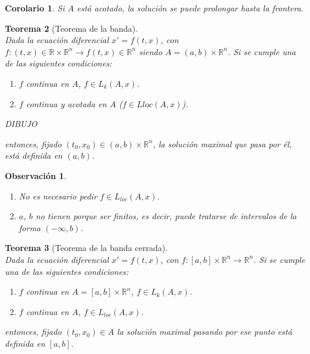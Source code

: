 \documentclass{article}
\theoremstyle{theorem-style}  %
\newtheorem{theorem}{Teorema}[section]  %
\newtheorem{corollary}[theorem]{Corolario} %
\theoremstyle{definition-style}
\newtheorem*{observation}{Observación} %
\theoremstyle{example-style}
\begin{document}
\begin{corollary}
	Si $A$ está acotado, la solución se puede prolongar hasta la frontera.
\end{corollary}
\begin{theorem}[Teorema de la banda]\label{banda} \ \\ 
	Dada la ecuación diferencial $x' = f(t, x)$, con $f: (t, x) \in \mathbb{R} \times \mathbb{R}^n \longrightarrow f(t, x) \in \mathbb{R}^n$ siendo $A = (a, b) \times \mathbb{R}^n$. Si se cumple una de las siguientes condiciones:
	\begin{enumerate}
		\item  $f$ continua en $A$, $f \in L_k (A, x)$.
		\item  $f$ continua y acotada en $A$ ($f \in L{loc} (A, x)$).
	\end{enumerate}
	
	DIBUJO
	
	entonces, fijado $(t_0, x_0) \in (a, b) \times \mathbb{R}^n$, la solución maximal que pasa por él, está definida en $(a, b)$.
\end{theorem}
\begin{observation} \ 
	\begin{enumerate}
		\item No es necesario pedir $f \in L_{loc} (A, x)$.
		\item $a$, $b$ no tienen porque ser finitos, es decir, puede tratarse de intervalos de la forma $(- \infty, b)$.
	\end{enumerate}
\end{observation}
\begin{theorem}[Teorema de la banda cerrada] \label{bandacerrada} \ \\
	Dada la ecuación diferencial $x' = f(t, x)$, con $f: [a, b] \times \mathbb{R}^n \longrightarrow \mathbb{R}^n$. Si se cumple una de las siguientes condiciones:
	\begin{enumerate}
		\item $f$ continua en $A = [a, b] \times \mathbb{R}^n$, $f \in L_k (A, x)$.
		\item $f$ continua en $A$, $f \in L_{loc} (A, x)$.
	\end{enumerate}
	entonces, fijado $(t_0, x_0) \in A$ la solución maximal pasando por ese punto está definida en $[a, b]$. 
\end{theorem}
\end{document}
